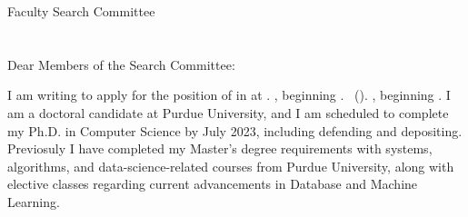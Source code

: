 \documentclass[9pt]{article}
\begin{document}
\thispagestyle{plain}

\pagestyle{empty}

Faculty Search Committee \\
\DepartmentName \\
\InstitutionName \\

Dear Members of the Search Committee:

I am writing to apply for the position of \PositionName{} 
\ifx\DepartmentName\undefined
\else
in 
\DepartmentName{} 
\fi
at \InstitutionName{}%
\ifx\shortInstitutionName\undefined
    \ifx\startDate\undefined
        .
    \else
        , beginning \startDate{}. %
    \fi
\else
    ~(\shortInstitutionName).   \ifx\startDate\undefined
    \else
        , beginning \startDate{}. %
    \fi
\fi
I am a doctoral candidate at Purdue University, and I am scheduled to complete my Ph.D. in Computer Science by July 2023, including defending and depositing. Previosuly I have completed my Master's degree requirements with systems, algorithms, and data-science-related courses from Purdue University, along with elective classes regarding current advancements in Database and Machine Learning. 
%
%
\end{document}
